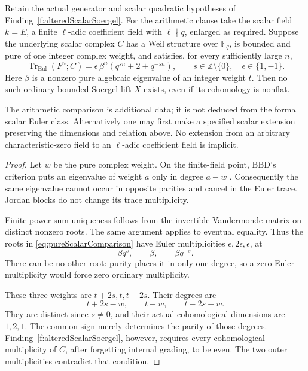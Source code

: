 \begin{finding}
\label{f:pureScalarSoergelNoGo}
Retain the actual generator and scalar quadratic hypotheses
of Finding~\ref{f:alteredScalarSoergel}. For the arithmetic
clause take the scalar field \(k=E\), a finite
\(\ell\)-adic coefficient field with \(\ell\nmid q\),
enlarged as required.
Suppose the underlying scalar complex \(C\) has a Weil
structure over \(\mathbb F_q\), is bounded and pure of
one integer complex weight, and satisfies, for every
sufficiently large \(n\),
\begin{equation}\label{eq:pureScalarComparison}
 \operatorname{Tr}_{\mathrm{Eul}}(F^n;C)
  =\epsilon\,\beta^n(q^{sn}+2+q^{-sn}),
 \qquad s\in\mathbb Z\setminus\{0\},\quad
 \epsilon\in\{1,-1\}.
\end{equation}
Here \(\beta\) is a nonzero pure algebraic eigenvalue
of an integer weight \(t\). Then no such ordinary
bounded Soergel lift \(X\) exists, even if its cohomology
is nonflat.

The arithmetic comparison is additional data; it is not
deduced from the formal scalar Euler class.
Alternatively one may first make a specified scalar
extension preserving the dimensions and relation above.
No extension from an arbitrary characteristic-zero field
to an \(\ell\)-adic coefficient field is implicit.
\end{finding}

\begin{proof}
Let \(w\) be the pure complex weight. On the finite-field
point, BBD's criterion puts an eigenvalue of weight \(a\)
only in degree \(a-w\)
\cite[5.1.8, pp.~126--127]{BBD}.
Consequently the same eigenvalue cannot occur in
opposite parities and cancel in the Euler trace.
Jordan blocks do not change its trace multiplicity.

Finite power-sum uniqueness follows from the invertible
Vandermonde matrix on distinct nonzero roots. The same
argument applies to eventual equality.
Thus the roots in \eqref{eq:pureScalarComparison} have
Euler multiplicities \(\epsilon,2\epsilon,\epsilon\),
at
\[
                     \beta q^s,\qquad \beta,\qquad\beta q^{-s}.
\]
There can be no other root: purity places it in only
one degree, so a zero Euler multiplicity would force
zero ordinary multiplicity.

These three weights are \(t+2s,t,t-2s\). Their degrees
are
\[
                     t+2s-w,\qquad t-w,\qquad t-2s-w.
\]
They are distinct since \(s\ne0\), and their actual
cohomological dimensions are \(1,2,1\). The common
sign merely determines the parity of those degrees.
Finding~\ref{f:alteredScalarSoergel}, however, requires
every cohomological multiplicity of \(C\), after
forgetting internal grading, to be even.
The two outer multiplicities contradict that condition.
\end{proof}

